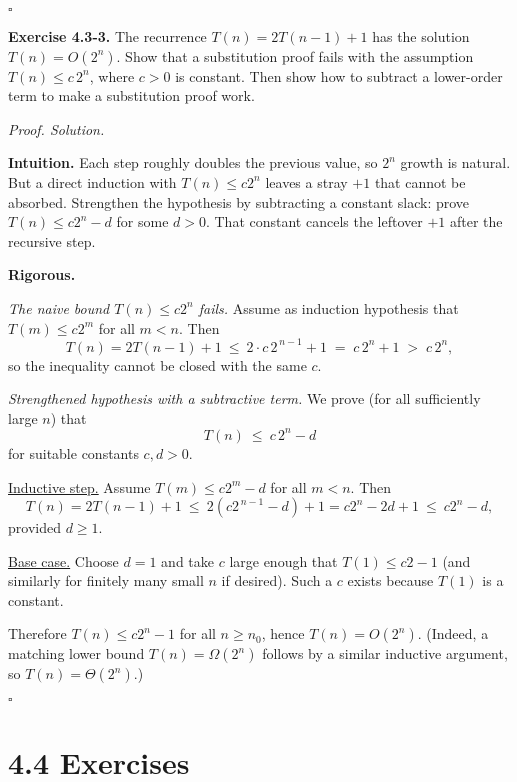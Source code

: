 \documentclass[12pt]{article}
\theoremstyle{definition}
\begin{document}
\hfill$\square$

\newpage

\noindent\textbf{Exercise 4.3-3.}
The recurrence $T(n)=2T(n-1)+1$ has the solution $T(n)=O(2^n)$.
Show that a substitution proof fails with the assumption $T(n)\le c\,2^n$, where $c>0$ is constant.
Then show how to subtract a lower-order term to make a substitution proof work.

\medskip
\noindent\textit{Proof. Solution.}

\noindent\textbf{Intuition.}
Each step roughly doubles the previous value, so $2^n$ growth is natural.
But a direct induction with $T(n)\le c2^n$ leaves a stray $+1$ that cannot be absorbed.
Strengthen the hypothesis by subtracting a constant slack: prove $T(n)\le c2^n-d$ for some $d>0$.
That constant cancels the leftover $+1$ after the recursive step.

\noindent\textbf{Rigorous.}

\emph{The naive bound $T(n)\le c2^n$ fails.}
Assume as induction hypothesis that $T(m)\le c2^m$ for all $m<n$.
Then
\[
T(n)=2T(n-1)+1\ \le\ 2\cdot c\,2^{\,n-1}+1 \;=\; c\,2^n+1 \;>\; c\,2^n,
\]
so the inequality cannot be closed with the same $c$.

\smallskip
\emph{Strengthened hypothesis with a subtractive term.}
We prove (for all sufficiently large $n$) that
\[
T(n)\ \le\ c\,2^n - d
\]
for suitable constants $c,d>0$.

\underline{Inductive step.}
Assume $T(m)\le c2^m-d$ for all $m<n$. Then
\[
T(n)=2T(n-1)+1\ \le\ 2(c2^{\,n-1}-d)+1
= c2^n - 2d + 1 \ \le\ c2^n - d,
\]
provided $d\ge 1$.

\underline{Base case.}
Choose $d=1$ and take $c$ large enough that $T(1)\le c2 - 1$ (and similarly for finitely many small $n$ if desired).
Such a $c$ exists because $T(1)$ is a constant.

Therefore $T(n)\le c2^n-1$ for all $n\ge n_0$, hence $T(n)=O(2^n)$.
(Indeed, a matching lower bound $T(n)=\Omega(2^n)$ follows by a similar inductive argument,
so $T(n)=\Theta(2^n)$.)

\hfill$\square$

\newpage

\dotfill
\section*{4.4 Exercises}
\dotfill

\newpage
\end{document}
